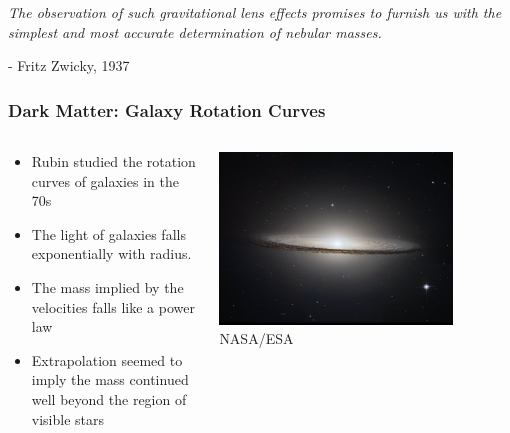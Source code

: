 \documentclass{beamer}
\begin{document}
\frame
{

    {\Large 
        {\em The observation of such gravitational lens effects promises to furnish us with
        the simplest and most accurate determination of nebular masses.}
        \newline

        \hfill - Fritz Zwicky, 1937
    }
}


\frame
{
    \frametitle{Dark Matter: Galaxy Rotation Curves}

    \begin{columns}
        \begin{column}{0.5\textwidth}    
            \begin{itemize}

                \item Rubin studied the rotation curves of galaxies in the 70s

                \item The light of galaxies falls exponentially with radius.

                \item The mass implied by the velocities falls like a power law

                \item Extrapolation seemed to imply the mass continued well
                    beyond the region of visible stars

            \end{itemize}
        \end{column}
        \begin{column}{0.5\textwidth}
            \begin{center}
                \includegraphics[width=0.8\textwidth]{m104-2013-03-01-HLA-5238-HLA-crop-scaled.jpg}
                \newline
                {\tiny NASA/ESA}


\end{center}
\end{column}
\end{columns}}
\end{document}
